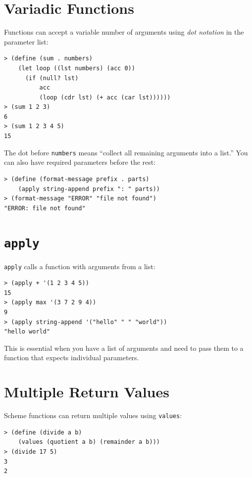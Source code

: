\section{Variadic Functions}

Functions can accept a variable number of arguments using \emph{dot notation} in the parameter list:

\begin{lstlisting}[style=repl]
> (define (sum . numbers)
    (let loop ((lst numbers) (acc 0))
      (if (null? lst)
          acc
          (loop (cdr lst) (+ acc (car lst))))))
> (sum 1 2 3)
6
> (sum 1 2 3 4 5)
15
\end{lstlisting}

The dot before \texttt{numbers} means ``collect all remaining arguments into a list.'' You can also have required parameters before the rest:

\begin{lstlisting}[style=repl]
> (define (format-message prefix . parts)
    (apply string-append prefix ": " parts))
> (format-message "ERROR" "file not found")
"ERROR: file not found"
\end{lstlisting}

\section{\texttt{apply}}

\texttt{apply} calls a function with arguments from a list:

\begin{lstlisting}[style=repl]
> (apply + '(1 2 3 4 5))
15
> (apply max '(3 7 2 9 4))
9
> (apply string-append '("hello" " " "world"))
"hello world"
\end{lstlisting}

This is essential when you have a list of arguments and need to pass them to a function that expects individual parameters.

\section{Multiple Return Values}

Scheme functions can return multiple values using \texttt{values}:

\begin{lstlisting}[style=repl]
> (define (divide a b)
    (values (quotient a b) (remainder a b)))
> (divide 17 5)
3
2
\end{lstlisting}

